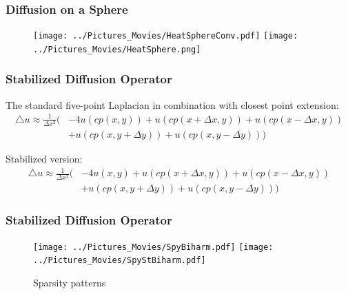 \documentclass{beamer}
\begin{document}
\begin{frame}
\frametitle{Diffusion on a Sphere}

\begin{figure}%
\centering
\texttt{[image: ../Pictures\_Movies/HeatSphereConv.pdf]}
\texttt{[image: ../Pictures\_Movies/HeatSphere.png]}
\end{figure}

\end{frame}


\begin{frame}
\frametitle{Stabilized Diffusion Operator} 

The standard five-point Laplacian in combination with closest point extension:
\begin{align*}
\triangle u \approx \frac{1}{\Delta x^2} \big( &-4u(cp(x, y)) + u(cp(x+\Delta x, y)) + 
u(cp(x-\Delta x, y)) \\ &+ u(cp(x, y+\Delta y)) + u(cp(x, y-\Delta y)) \big)
\end{align*}

Stabilized version:
\begin{align*}
\triangle u \approx \frac{1}{\Delta x^2} \big( &-4u(x, y) + u(cp(x+\Delta x, y)) + 
u(cp(x-\Delta x, y)) \\ &+ u(cp(x, y+\Delta y)) + u(cp(x, y-\Delta y)) \big)
\end{align*} 



\end{frame}


\begin{frame}
\frametitle{Stabilized Diffusion Operator} 

\begin{figure}%
\centering
\texttt{[image: ../Pictures\_Movies/SpyBiharm.pdf]}
\texttt{[image: ../Pictures\_Movies/SpyStBiharm.pdf]}
\caption{Sparsity patterns}
\end{figure}

\end{frame}
\end{document}
